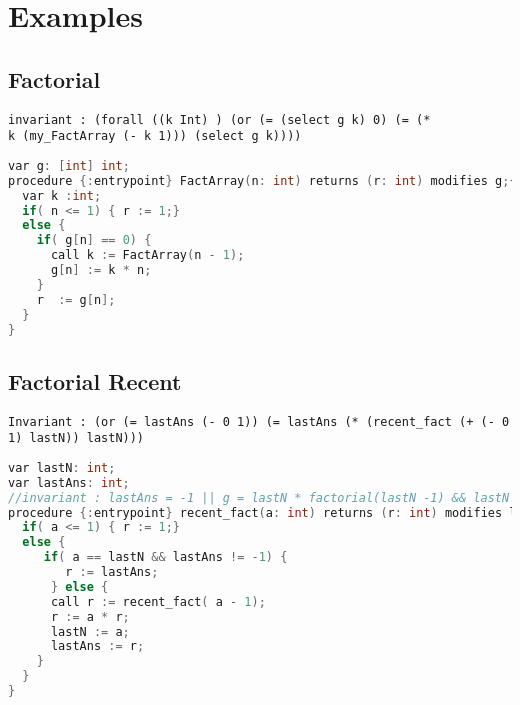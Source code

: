 \section{Examples}

\subsection{Factorial}
\begin{verbatim}
invariant : (forall ((k Int) ) (or (= (select g k) 0) (= (*
k (my_FactArray (- k 1))) (select g k))))
\end{verbatim}
\begin{lstlisting}[language=c, caption= {Procedure `factorial' :
      returns factorial of `n' and memoizes result for argument value
      `19'.}, label=lst:factImpl]
var g: [int] int;
procedure {:entrypoint} FactArray(n: int) returns (r: int) modifies g;{
  var k :int;
  if( n <= 1) { r := 1;}
  else {
    if( g[n] == 0) {
      call k := FactArray(n - 1);
      g[n] := k * n;
    } 
    r  := g[n];
  }
}
\end{lstlisting}

\subsection{Factorial Recent}
\begin{verbatim}
Invariant : (or (= lastAns (- 0 1)) (= lastAns (* (recent_fact (+ (- 0 1) lastN)) lastN)))
\end{verbatim}
\begin{lstlisting}[language=c, caption= {Procedure `recent\_fact' :
      returns factorial of `n' and memoizes result for the last argument value.}, label=lst:factorialRecent]
var lastN: int;
var lastAns: int;
//invariant : lastAns = -1 || g = lastN * factorial(lastN -1) && lastN >1 
procedure {:entrypoint} recent_fact(a: int) returns (r: int) modifies lastN, lastAns;{
  if( a <= 1) { r := 1;}
  else {
     if( a == lastN && lastAns != -1) {
        r := lastAns;
      } else {
      call r := recent_fact( a - 1);    
      r := a * r;
      lastN := a;
      lastAns := r;
    }
  }
}
\end{lstlisting}


